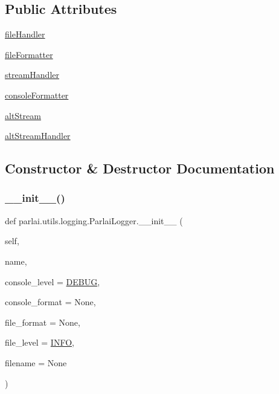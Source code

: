 \subsection*{Public Attributes}
\begin{DoxyCompactItemize}
\item 
\hyperlink{classparlai_1_1utils_1_1logging_1_1ParlaiLogger_a50c9155a1b765f79e15d64090ad0a236}{file\+Handler}
\item 
\hyperlink{classparlai_1_1utils_1_1logging_1_1ParlaiLogger_ae795816c275c3f3756f72d542a965748}{file\+Formatter}
\item 
\hyperlink{classparlai_1_1utils_1_1logging_1_1ParlaiLogger_a2c40840c6e6fa00eb4cdae9146907b78}{stream\+Handler}
\item 
\hyperlink{classparlai_1_1utils_1_1logging_1_1ParlaiLogger_ac973ab3558d792af0494970d14ee2c5e}{console\+Formatter}
\item 
\hyperlink{classparlai_1_1utils_1_1logging_1_1ParlaiLogger_a5b1bdad4c97a74ea4e38f678ae0edd2c}{alt\+Stream}
\item 
\hyperlink{classparlai_1_1utils_1_1logging_1_1ParlaiLogger_acaf2a0925cad1af3df14b3776f900f55}{alt\+Stream\+Handler}
\end{DoxyCompactItemize}


\subsection{Constructor \& Destructor Documentation}
\mbox{\label{classparlai_1_1utils_1_1logging_1_1ParlaiLogger_ade632e1d848beb962a35797c02f51407}} 
\subsubsection{\texorpdfstring{\+\_\+\+\_\+init\+\_\+\+\_\+()}{\_\_init\_\_()}}
{\footnotesize\ttfamily def parlai.\+utils.\+logging.\+Parlai\+Logger.\+\_\+\+\_\+init\+\_\+\+\_\+ (\begin{DoxyParamCaption}\item[{}]{self,  }\item[{}]{name,  }\item[{}]{console\+\_\+level = {\ttfamily \hyperlink{namespaceparlai_1_1utils_1_1logging_ab324194e88a7aab20579ec176d8e47ed}{D\+E\+B\+UG}},  }\item[{}]{console\+\_\+format = {\ttfamily None},  }\item[{}]{file\+\_\+format = {\ttfamily None},  }\item[{}]{file\+\_\+level = {\ttfamily \hyperlink{namespaceparlai_1_1utils_1_1logging_a4bc2de74317465e5d1a8b5d7b913d48a}{I\+N\+FO}},  }\item[{}]{filename = {\ttfamily None} }\end{DoxyParamCaption})}

